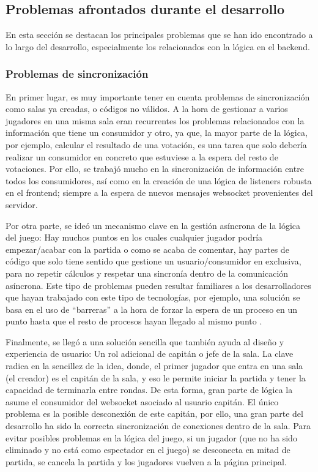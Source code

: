\subsection{Problemas afrontados durante el desarrollo}

En esta sección se destacan los principales problemas que se han ido encontrado a lo largo del desarrollo, especialmente los relacionados con 
la lógica en el backend.

\subsubsection{Problemas de sincronización}
En primer lugar, es muy importante tener en cuenta problemas de sincronización como salas ya creadas, o códigos no válidos. A la hora de gestionar a varios jugadores en una misma sala
eran recurrentes los problemas relacionados con la información que tiene un consumidor y otro, ya que, la mayor parte de la lógica, por ejemplo, calcular el resultado de una votación,
es una tarea que solo debería realizar un consumidor en concreto que estuviese a la espera del resto de votaciones. Por ello, se trabajó mucho en la sincronización de información
entre todos los consumidores, así como en la creación de una lógica de listeners robusta en el frontend; siempre a la espera de nuevos mensajes websocket provenientes del servidor.

Por otra parte, se ideó un mecanismo clave en la gestión asíncrona de la lógica del juego: Hay muchos puntos en los cuales cualquier jugador podría empezar/acabar con la partida
o como se acaba de comentar, hay partes de código que solo tiene sentido que gestione un usuario/consumidor en exclusiva, para no repetir cálculos y respetar una sincronía dentro
de la comunicación asíncrona. Este tipo de problemas pueden resultar familiares a los desarrolladores que hayan trabajado con este tipo de tecnologías, por ejemplo, una solución
se basa en el uso de ``barreras'' a la hora de forzar la espera de un proceso en un punto hasta que el resto de procesos hayan llegado al mismo punto \cite{Barrier}. 

Finalmente, se llegó a una solución sencilla que también ayuda al diseño y experiencia de usuario: Un rol adicional de capitán o jefe de la sala. La clave radica en la sencillez de la idea, 
donde, el primer jugador que entra en una sala (el creador) es el capitán de la sala, y eso le permite iniciar la partida y tener la capacidad de terminarla entre rondas. De esta forma, gran parte de lógica la asume el 
consumidor del websocket asociado al usuario capitán. El único problema es la posible desconexión de este capitán, por ello, una gran parte del desarrollo ha sido la correcta sincronización de conexiones dentro 
de la sala. Para evitar posibles problemas en la lógica del juego, si un jugador (que no ha sido eliminado y no está como espectador en el juego) se desconecta en mitad de partida, se cancela la partida 
y los jugadores vuelven a la página principal.

